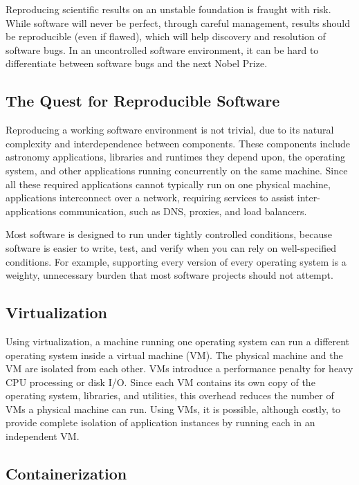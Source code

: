 \documentclass[11pt,twoside]{article}
\begin{document}
Reproducing scientific results on an unstable foundation is fraught with risk.
While software will never be perfect, through careful management, results should
be reproducible (even if flawed), which will help discovery and resolution of
software bugs.  In an uncontrolled software environment, it can be hard to
differentiate between software bugs and the next Nobel Prize.

\subsection{The Quest for Reproducible Software}

Reproducing a working software environment is not trivial, due to
its natural complexity and interdependence between components.  These components
include astronomy applications, libraries and runtimes they depend upon, the
operating system, and other applications running concurrently on the same machine.
Since all these required applications cannot
typically run on one physical machine, applications interconnect over a network,
requiring services to assist inter-applications communication, such as DNS, proxies,
and load balancers.

Most software is designed to run under tightly controlled conditions, because
software is easier to write, test, and verify when you can rely on
well-specified conditions.  For example, supporting every version of every
operating system is a weighty, unnecessary burden that most software projects
should not attempt.

\subsection{Virtualization}

Using virtualization, a machine running one operating system can run a different
operating system inside a virtual machine (VM).  The physical machine and the VM
are isolated from each other.   VMs introduce a performance penalty for heavy CPU
processing or disk I/O.  Since each VM contains its own copy of the operating
system, libraries, and utilities, this overhead reduces the number of VMs a physical machine
can run.  Using VMs, it is possible, although costly, to provide complete isolation of
application instances by running each in an independent VM.

\subsection{Containerization}
\end{document}
